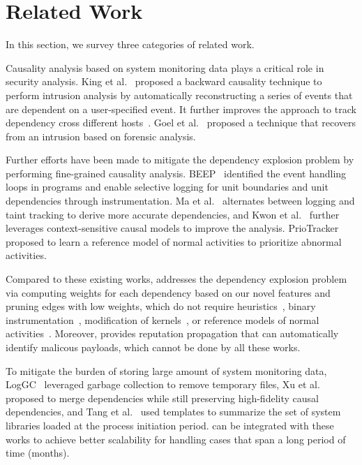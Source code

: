 
\section{Related Work}
\label{sec:literature}

In this section, we survey three categories of related work.

Causality analysis based on system monitoring data plays a critical role in security analysis.
King et al.~\cite{backtracking} proposed a backward causality
technique to perform intrusion analysis by 
automatically reconstructing a series of events that are dependent on a user-specified event.
It further improves the approach to track dependency cross different hosts~\cite{backtracking2}.
Goel et al.~\cite{taser} proposed a technique that recovers from an intrusion
based on forensic analysis.

Further efforts have been made to mitigate the dependency explosion problem by performing fine-grained causality analysis. BEEP~\cite{beep} identified the event handling loops in programs and enable selective logging for unit boundaries and unit dependencies through instrumentation. Ma et al.~\cite{ma2016protracer}  alternates between logging and taint tracking to derive more accurate dependencies,
and Kwon et al.~\cite{mcitracking} further leverages context-sensitive causal models to improve the analysis.
PrioTracker~\cite{timelytrack} proposed to learn a reference model of normal activities to prioritize abnormal activities.

Compared to these existing works, \tool addresses the dependency explosion problem via computing weights for each dependency based on our novel features and pruning edges with low weights, which do not require heuristics~\cite{backtracking,backtracking2}, binary instrumentation~\cite{ma2016protracer,mcitracking}, modification of kernels~\cite{trustkernel}, or reference models of normal activities~\cite{timelytrack}.
Moreover, \tool provides reputation propagation that can automatically identify malicous payloads, which cannot be done by all these works. 

To mitigate the burden of storing large amount of system monitoring data, 
LogGC~\cite{loggc} leveraged garbage collection to remove temporary files,
Xu et al.~\cite{reduction} proposed to merge dependencies while still preserving high-fidelity causal dependencies,
and Tang et al.~\cite{reduction2} used templates to summarize the set of system libraries loaded at the process initiation period.
\tool can be integrated with these works to achieve better scalability for handling cases that span a long period of time (\eg months).

